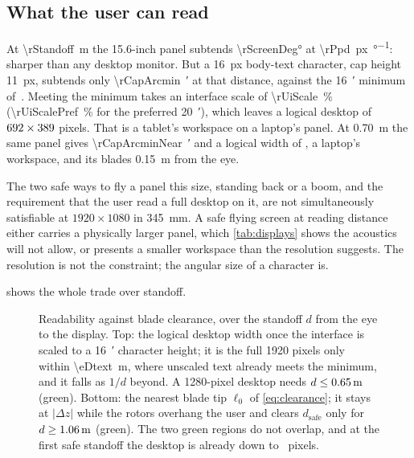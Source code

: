 \subsection{What the user can read}
\label{sec:readability}

At \SI{\rStandoff}{\metre} the 15.6-inch panel subtends \ang{\rScreenDeg} at
\SI{\rPpd}{px\per\degree}: sharper than any desktop monitor. But a
\SI{16}{px} body-text character, cap height \SI{11}{px}, subtends only
\SI{\rCapArcmin}{\arcminute} at that distance, against the \SI{16}{\arcminute}
minimum of~\cite{hfes2007}. Meeting the minimum takes an interface scale of
\SI{\rUiScale}{\percent} (\SI{\rUiScalePref}{\percent} for the preferred
\SI{20}{\arcminute}), which leaves a logical desktop of
$692\times389$ pixels. That is a tablet's workspace on a
laptop's panel. At \SI{0.70}{\metre} the same panel gives
\SI{\rCapArcminNear}{\arcminute} and a logical width of \rLogicalWNear, a
laptop's workspace, and its blades \SI{0.15}{\metre} from the eye.

\begin{finding}
The two safe ways to fly a panel this size, standing back or a boom, and the
requirement that the user read a full desktop on it, are not simultaneously
satisfiable at $1920\times1080$ in \SI{345}{\milli\metre}. A safe flying
screen at reading distance either carries a physically larger panel, which
\cref{tab:displays} shows the acoustics will not allow, or presents a smaller
workspace than the resolution suggests. The resolution is not the constraint;
the angular size of a character is.
\end{finding}

 shows the whole trade over standoff.

\begin{figure}[tbp]
\centering

\caption{Readability against blade clearance, over the standoff $d$ from the
eye to the display. Top: the logical desktop width once the interface is
scaled to a \SI{16}{\arcminute} character height; it is the full \num{1920}
pixels only within \SI{\eDtext}{\metre}, where unscaled text already meets the
minimum, and it falls as $1/d$ beyond. A \num{1280}-pixel desktop needs
$d\le\SI{0.65}{\metre}$ (green). Bottom: the nearest blade tip $\ell_0$ of
\cref{eq:clearance}; it stays at $|\Delta z|$ while the rotors overhang the
user and clears $d_{\mathrm{safe}}$ only for $d\ge\SI{1.06}{\metre}$
(green). The two green regions do not overlap, and at the first safe standoff
the desktop is already down to \eLogicalAtCross\ pixels.}
\label{fig:readability}
\end{figure}

